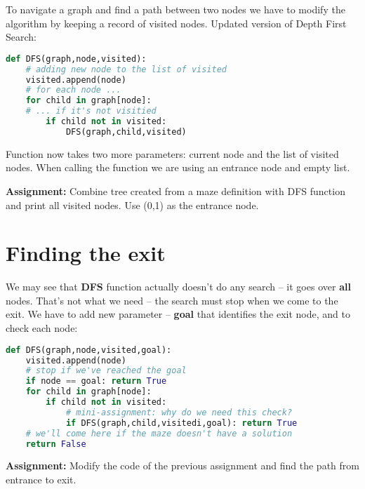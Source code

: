 To navigate a graph and find a path between two nodes we
have to modify the algorithm by keeping a record of visited
nodes. Updated version of Depth First Search:

\begin{lstlisting}[language=Python,style=codelst2,caption={Python: DFS with saving visited nodes}]
def DFS(graph,node,visited):
    # adding new node to the list of visited
    visited.append(node)
    # for each node ...
    for child in graph[node]:
    # ... if it's not visitied
        if child not in visited:
            DFS(graph,child,visited)
\end{lstlisting}

Function now takes two more parameters: current node and the list
of visited nodes. When calling the function we are using
an entrance node and empty list.

\begin{tcolorbox}
\textbf{Assignment:}
Combine tree created from a maze definition with DFS function and
print all visited nodes. Use (0,1) as the entrance node.
\end{tcolorbox}

\section{Finding the exit}

We may see that \textbf{DFS} function actually doesn't do any search --
it goes over \textbf{all} nodes. That's not what we need -- the search must
stop when we come to the exit. We have to add new parameter -- \textbf{goal}
that identifies the exit node, and to check each node:

\newpage

\begin{lstlisting}[language=Python,style=codelst2,caption={Python: DFS with checking the goal}]
def DFS(graph,node,visited,goal):
    visited.append(node)
    # stop if we've reached the goal
    if node == goal: return True
    for child in graph[node]:
        if child not in visited:
            # mini-assignment: why do we need this check?
            if DFS(graph,child,visitedi,goal): return True
    # we'll come here if the maze doesn't have a solution
    return False
\end{lstlisting}


\begin{tcolorbox}
\textbf{Assignment:}
Modify the code of the previous assignment and find the path from
entrance to exit.
\end{tcolorbox}


